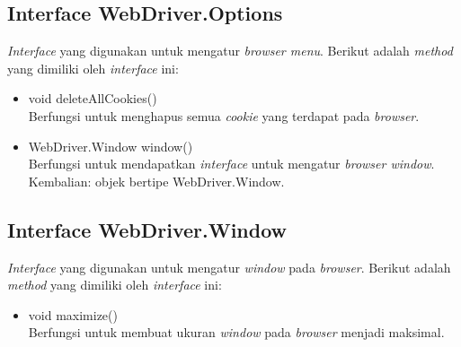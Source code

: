 
\subsection{Interface WebDriver.Options}
\textit{Interface} yang digunakan untuk mengatur \textit{browser menu}. Berikut adalah
\textit{method} yang dimiliki oleh \textit{interface} ini:
\begin{itemize}
\item void deleteAllCookies()\\
Berfungsi untuk menghapus semua \textit{cookie} yang terdapat pada \textit{browser}.
\item WebDriver.Window window()\\
Berfungsi untuk mendapatkan \textit{interface} untuk mengatur \textit{browser window}.\\
Kembalian: objek bertipe WebDriver.Window.
\end{itemize}


\subsection{Interface WebDriver.Window}
\label{subsec:webdriveroption}
\textit{Interface} yang digunakan untuk mengatur \textit{window} pada \textit{browser}. Berikut adalah \textit{method} yang dimiliki oleh \textit{interface} ini:
\begin{itemize}
\item void maximize()\\
Berfungsi untuk membuat ukuran \textit{window} pada \textit{browser} menjadi maksimal.
\end{itemize}

